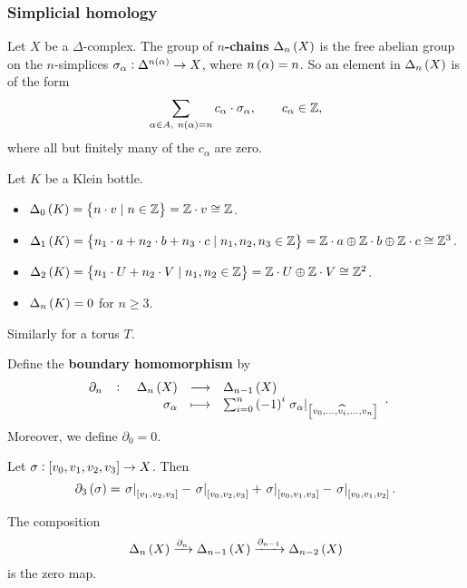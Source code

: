 \subsubsection{Simplicial homology}

Let $ X $ be a $ \Delta $-complex. The group of \textbf{$ n $-chains} $ \Delta_n\br{X} $ is the free abelian group on the $ n $-simplices $ \sigma_\alpha : \Delta^{n\br{\alpha}} \to X $, where $ n\br{\alpha} = n $. So an element in $ \Delta_n\br{X} $ is of the form
$$ \sum_{\alpha \in A, \ n\br{\alpha} = n} c_\alpha \cdot \sigma_\alpha, \qquad c_\alpha \in \Z, $$
where all but finitely many of the $ c_\alpha $ are zero.

\begin{example*}
Let $ K $ be a Klein bottle.
\begin{itemize}
\item $ \Delta_0\br{K} = \cbr{n \cdot v \mid n \in \Z} = \Z \cdot v \cong \Z $.
\item $ \Delta_1\br{K} = \cbr{n_1 \cdot a + n_2 \cdot b + n_3 \cdot c \mid n_1, n_2, n_3 \in \Z} = \Z \cdot a \oplus \Z \cdot b \oplus \Z \cdot c \cong \Z^3 $.
\item $ \Delta_2\br{K} = \cbr{n_1 \cdot U + n_2 \cdot V \mid n_1, n_2 \in \Z} = \Z \cdot U \oplus \Z \cdot V \cong \Z^2 $.
\item $ \Delta_n\br{K} = 0 $ for $ n \ge 3 $.
\end{itemize}
Similarly for a torus $ T $.
\end{example*}


Define the \textbf{boundary homomorphism} by
$$ \function[\partial_n]{\Delta_n\br{X}}{\Delta_{n - 1}\br{X}}{\sigma_\alpha}{\sum_{i = 0}^n \br{-1}^i\eval{\sigma_\alpha}_{\sbr{v_0, \dots, \widehat{v_i}, \dots, v_n}}}. $$
Moreover, we define $ \partial_0 = 0 $.

\begin{example*}
Let $ \sigma : \sbr{v_0, v_1, v_2, v_3} \to X $. Then
$$ \partial_3\br{\sigma} = \eval{\sigma}_{\sbr{v_1, v_2, v_3}} - \eval{\sigma}_{\sbr{v_0, v_2, v_3}} + \eval{\sigma}_{\sbr{v_0, v_1, v_3}} - \eval{\sigma}_{\sbr{v_0, v_1, v_2}}. $$
\end{example*}

\begin{lemma}
\label{lem:2.1}
The composition
$$ \Delta_n\br{X} \xrightarrow{\partial_n} \Delta_{n - 1}\br{X} \xrightarrow{\partial_{n - 1}} \Delta_{n - 2}\br{X} $$
is the zero map.
\end{lemma}


